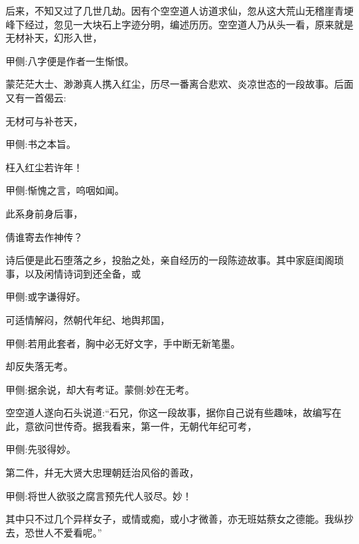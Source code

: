 \begin{parag}
    后来，不知又过了几世几劫。因有个空空道人访道求仙，忽从这大荒山无稽崖青埂峰下经过，忽见一大块石上字迹分明，编述历历。空空道人乃从头一看，原来就是无材补天，幻形入世，\begin{note}甲侧:八字便是作者一生惭恨。\end{note}蒙茫茫大士、渺渺真人携入红尘，历尽一番离合悲欢、炎凉世态的一段故事。后面又有一首偈云:
\end{parag}


\begin{poem}
    \begin{pl} 无材可与补苍天，\end{pl}\begin{note}甲侧:书之本旨。\end{note}

    \begin{pl} 枉入红尘若许年！\end{pl}\begin{note}甲侧:惭愧之言，呜咽如闻。\end{note}

    \begin{pl} 此系身前身后事，\end{pl}

    \begin{pl} 倩谁寄去作神传？\end{pl}
\end{poem}


\begin{parag}
    诗后便是此石堕落之乡，投胎之处，亲自经历的一段陈迹故事。其中家庭闺阁琐事，以及闲情诗词到还全备，或\begin{note}甲侧:或字谦得好。\end{note}可适情解闷，然朝代年纪、地舆邦国，\begin{note}甲侧:若用此套者，胸中必无好文字，手中断无新笔墨。\end{note}却反失落无考。\begin{note}甲侧:据余说，却大有考证。蒙侧:妙在无考。\end{note}
\end{parag}


\begin{parag}
    空空道人遂向石头说道:“石兄，你这一段故事，据你自己说有些趣味，故编写在此，意欲问世传奇。据我看来，第一件，无朝代年纪可考，\begin{note}甲侧:先驳得妙。\end{note}第二件，幷无大贤大忠理朝廷治风俗的善政，\begin{note}甲侧:将世人欲驳之腐言预先代人驳尽。妙！\end{note}其中只不过几个异样女子，或情或痴，或小才微善，亦无班姑蔡女之德能。我纵抄去，恐世人不爱看呢。”
\end{parag}


